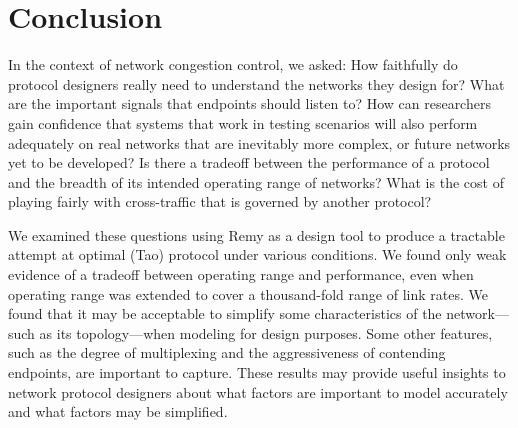 \section{Conclusion}
\label{learn:concl}

In the context of network congestion control, we asked: How faithfully
do protocol designers really need to understand the networks they
design for? What are the important signals that endpoints should
listen to?  How can researchers gain confidence that systems that work
in testing scenarios will also perform adequately on real networks
that are inevitably more complex, or future networks yet to be
developed? Is there a tradeoff between the performance of a protocol
and the breadth of its intended operating range of networks?  What is
the cost of playing fairly with cross-traffic that is governed by
another protocol?

We examined these questions using Remy as a design tool to produce a
tractable attempt at optimal (Tao) protocol under various
conditions. We found only weak evidence of a tradeoff between
operating range and performance, even when operating range was
extended to cover a thousand-fold range of link rates. We found that
it may be acceptable to simplify some characteristics of the
network---such as its topology---when modeling for design
purposes. Some other features, such as the degree of multiplexing and
the aggressiveness of contending endpoints, are important to
capture. These results may provide useful insights to network protocol
designers about what factors are important to model accurately and
what factors may be simplified.
